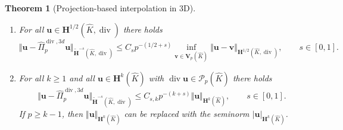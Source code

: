 \documentclass{article}
\newtheorem{theorem}{Theorem}[section]
\newcommand{\hatPidivcom}{\widehat\Pi^{\operatorname*{div},3d}_{p}}
\begin{document}
\begin{theorem}[Projection-based interpolation in 3D]
\begin{enumerate}
\item 
\label{item:thm:projection-based-interpolation-vi} 
For all ${\mathbf{u}%
}\in{\mathbf{H}}^{1/2}(\widehat{K},\operatorname{div})$ there holds
\[
\Vert{\mathbf{u}}-\hatPidivcom{\mathbf{u}}%
\Vert_{\widetilde{\mathbf{H}}^{-s}(\widehat{K},\operatorname{div})}\leq C_s p^{-(1/2+s)}%
\inf_{{\mathbf{v}}\in\boldsymbol{V}_{p}(\widehat{K})}\Vert{\mathbf{u}}-{\mathbf{v}}\Vert_{{\mathbf{H}}%
^{1/2}(\widehat{K},\operatorname{div})}, \qquad s\in [0,1].
\]

\item 
\label{item:thm:projection-based-interpolation-vii} 
For all $k\geq1$ and
all ${\mathbf{u}}\in{\mathbf{H}}^{k}(\widehat{K})$ with $\operatorname*{div}%
{\mathbf{u}}\in {\mathcal{P}}_{p}(\widehat{K})$ there holds
\begin{equation}
\Vert{\mathbf{u}}-\hatPidivcom{\mathbf{u}}%
\Vert_{\widetilde{\mathbf{H}}^{-s}(\widehat{K},\operatorname{div})}\leq C_{s,k}p^{-(k+s)}\Vert{\mathbf{u}}\Vert
_{\mathbf{H}^{k}(\widehat{K})}, \qquad s\in [0,1].
\label{eq:lemma:projection-based-interpolation-approximation-15}%
\end{equation}
If $p\geq k-1$, then $\Vert{\mathbf{u}}\Vert_{{\mathbf{H}}%
^{k}(\widehat{K})}$ can be replaced with the seminorm $|{\mathbf{u}%
}|_{{\mathbf{H}}^{k}(\widehat{K})}$.

\end{enumerate}
\end{theorem}
\end{document}
